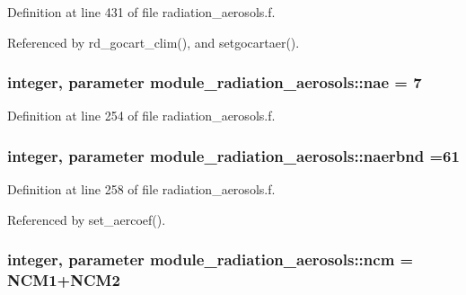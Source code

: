 Definition at line 431 of file radiation\+\_\+aerosols.\+f.



Referenced by rd\+\_\+gocart\+\_\+clim(), and setgocartaer().

\subsubsection[{\texorpdfstring{nae}{nae}}]{\setlength{\rightskip}{0pt plus 5cm}integer, parameter module\+\_\+radiation\+\_\+aerosols\+::nae = 7\hspace{0.3cm}{\ttfamily [private]}}\hypertarget{namespacemodule__radiation__aerosols_a45121ca4dcb3194e8afb4090fa810657}{}\label{namespacemodule__radiation__aerosols_a45121ca4dcb3194e8afb4090fa810657}


Definition at line 254 of file radiation\+\_\+aerosols.\+f.

\subsubsection[{\texorpdfstring{naerbnd}{naerbnd}}]{\setlength{\rightskip}{0pt plus 5cm}integer, parameter module\+\_\+radiation\+\_\+aerosols\+::naerbnd =61\hspace{0.3cm}{\ttfamily [private]}}\hypertarget{namespacemodule__radiation__aerosols_ae8ffb66e7e617f045663ce2732743b4a}{}\label{namespacemodule__radiation__aerosols_ae8ffb66e7e617f045663ce2732743b4a}


Definition at line 258 of file radiation\+\_\+aerosols.\+f.



Referenced by set\+\_\+aercoef().

\subsubsection[{\texorpdfstring{ncm}{ncm}}]{\setlength{\rightskip}{0pt plus 5cm}integer, parameter module\+\_\+radiation\+\_\+aerosols\+::ncm = N\+C\+M1+N\+C\+M2\hspace{0.3cm}{\ttfamily [private]}}\hypertarget{namespacemodule__radiation__aerosols_ab46e61a4a386794a5e9e97d8ef7d98a5}{}\label{namespacemodule__radiation__aerosols_ab46e61a4a386794a5e9e97d8ef7d98a5}


